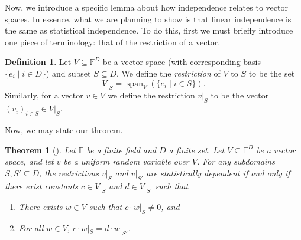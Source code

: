 \documentclass[english,12pt]{reedthesis}
\theoremstyle{plain}
\newtheorem{thm}{Theorem}[section]
\theoremstyle{definition}
\newtheorem{defn}[defn]{Definition}
\theoremstyle{remark}
\DeclareMathOperator{\spn}{span}
\begin{document}
Now, we introduce a specific lemma about how independence relates to vector
spaces. In essence, what we are planning to show is that linear independence is
the same as statistical independence. To do this, first we must briefly
introduce one piece of terminology: that of the restriction of a vector.

\begin{defn}\label{def:restrict-vs}
  Let $V \subseteq \mathbb{F}^{D}$ be a vector space (with corresponding basis
  $\{e_{i} \mid i \in D\}$) and subset $S \subseteq D$. We define the \emph{restriction} of
  $V$ to $S$ to be the set
  \begin{equation}
    V|_{S} = \spn_{V}(\{e_{i} \mid i \in S\}).
  \end{equation}
  Similarly, for a vector $v \in V$ we define the restriction $v|_{S}$ to be the
  vector $(v_{i})_{i \in S} \in V|_{S}$.
\end{defn}

Now, we may state our theorem.

\begin{thm}[{\cite[Claim 2]{CFGS22}}]\label{thm:lin-indep-stat-indep}
  Let $\mathbb{F}$ be a finite field and $D$ a finite set. Let
  $V \subseteq \mathbb{F}^{D}$ be a vector space, and let $v$ be a uniform random
  variable over $V$. For any subdomains $S, S' \subseteq D$, the restrictions $v|_{S}$
  and $v|_{S'}$ are statistically dependent if and only if there exist constants
  $c \in V|_{S}$ and $d \in V|_{S'}$ such that
  \begin{enumerate}
    \item There exists $w \in V$ such that $c \cdot w|_{S} \ne 0$, and
    \item For all $w \in V$, $c \cdot w|_{S} = d \cdot w|_{S'}$.
  \end{enumerate}
\end{thm}
\end{document}
